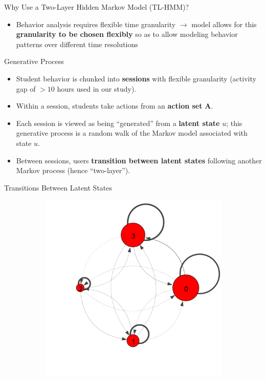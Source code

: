 \documentclass[final,t]{beamer}
\newcommand{\msp}[0]{\\[0.5\baselineskip]}
\newcommand{\vsp}[0]{\vspace{0.165in}}
\begin{document}
\begin{frame}[fragile]
\begin{columns}[t]
\begin{column}{0.6\textwidth}
\begin{block}{Why Use a Two-Layer Hidden Markov Model (TL-HMM)?}
\begin{itemize}
          \item Behavior analysis requires flexible time granularity
            $\rightarrow$ model allows for this \textbf{granularity to be
            chosen flexibly} so as to allow modeling behavior patterns over
            different time resolutions
        \end{itemize}
      \end{block}
      \vsp{}
      \begin{block}{Generative Process}
        \begin{itemize}
          \item Student behavior is chunked into \textbf{sessions} with
            flexible granularity (activity gap of $>10$ hours used in our
            study). \msp{}
          \item Within a session, students take actions from an
            \textbf{action set} $\mathbf{A}$.
            \msp{}
          \item Each session is viewed as being ``generated'' from a
            \textbf{latent state} $u$; this generative process is a random
            walk of the Markov model associated with state $u$.
            \msp{}
          \item Between sessions, users \textbf{transition between latent
            states} following another Markov process (hence ``two-layer'').
        \end{itemize}
      \end{block}
      \vsp{}
      \begin{block}{Transitions Between Latent States}
        \begin{figure}
          \centering
          \begin{subfigure}[t]{0.32\textwidth}
            \includegraphics[width=\textwidth,trim={0 2cm 0 0cm}]{../../figures/trans-comp/trans-avg.png}

\end{subfigure}
\end{figure}
\end{block}
\end{column}
\end{columns}
\end{frame}
\end{document}
